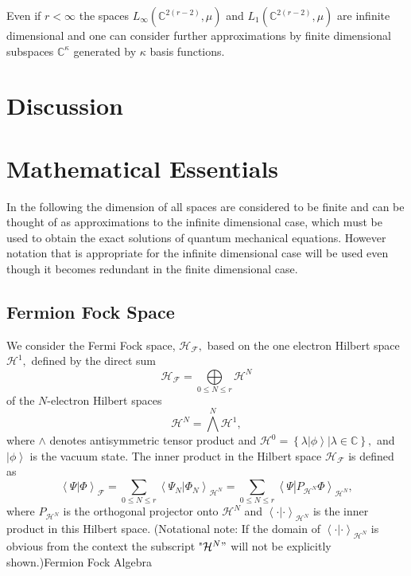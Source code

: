 \documentclass[aps,preprint]{revtex4}%
\begin{document}
Even if $r<\infty$ the spaces $L_{\infty}\left(  \mathbb{C}^{2\left(
r-2\right)  },\mu\right)  $ and $L_{1}\left(  \mathbb{C}^{2\left(  r-2\right)
},\mu\right)  $ are infinite dimensional and one can consider further
approximations by finite dimensional subspaces $\mathbb{C}^{\kappa}$ generated
by $\kappa$ basis functions.

\section{Discussion}

\appendix


\section{Mathematical Essentials}

\label{Math}

In the following the dimension of all spaces are considered to be finite and
can be thought of as approximations to the infinite dimensional case, which
must be used to obtain the exact solutions of quantum mechanical equations.
However notation that is appropriate for the infinite dimensional case will be
used even though it becomes redundant in the finite dimensional case.

\subsection{Fermion Fock Space \label{Fermi Fock Space}}

We consider the Fermi Fock space, $\mathcal{H}_{\mathcal{F}},$ based on the
one electron Hilbert space $\mathcal{H}^{1},$ defined by the direct sum
\begin{equation}
\mathcal{H}_{\mathcal{F}}=\underset{0\leq N\leq r}{\bigoplus}\mathcal{H}^{N}%
\end{equation}
of the $N$-electron Hilbert spaces
\begin{equation}
\mathcal{H}^{N}=\bigwedge\limits^{N}\mathcal{H}^{1},
\end{equation}
where $\wedge$ denotes antisymmetric tensor product and $\mathcal{H}%
^{0}=\left\{  \left.  \lambda\left\vert \phi\right\rangle \right\vert
\lambda\in\mathbb{C}\right\}  ,$ and $\left\vert \phi\right\rangle $ is the
vacuum state. The inner product in the Hilbert space $\mathcal{H}%
_{\mathcal{F}}$ is defined as
\begin{equation}
\left\langle \Psi\left\vert \Phi\right.  \right\rangle _{\mathcal{F}}%
=\sum_{0\leq N\leq r}\left\langle \Psi_{N}\left\vert \Phi_{N}\right.
\right\rangle _{\mathcal{H}^{N}}=\sum_{0\leq N\leq r}\left\langle
\Psi\left\vert P_{\mathcal{H}^{N}}\Phi\right.  \right\rangle _{\mathcal{H}%
^{N}},
\end{equation}
where $P_{\mathcal{H}^{N}}$ is the orthogonal projector onto $\mathcal{H}^{N}$
and $\left\langle \cdot\left\vert \cdot\right.  \right\rangle _{\mathcal{H}%
^{N}}$ is the inner product in this Hilbert space. (Notational note: If the
domain of $\left\langle \cdot\left\vert \cdot\right.  \right\rangle
_{\mathcal{H}^{N}}$ is obvious from the context the subscript "$\mathcal{H}%
^{N}"$ will not be explicitly shown.)Fermion Fock Algebra
\label{Fermi Fock Alg}
\end{document}
